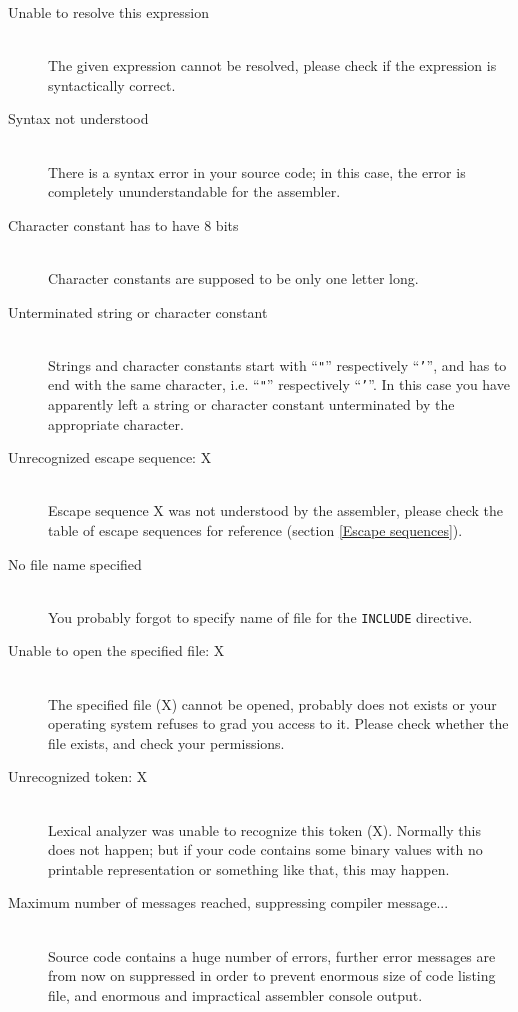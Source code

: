 \begin{description}
        \item[Unable to resolve this expression]~\\
            The given expression cannot be resolved, please check if the expression is syntactically correct.
        \item[Syntax not understood]~\\
            There is a syntax error in your source code; in this case, the error is completely ununderstandable for the assembler.
        \item[Character constant has to have 8 bits]~\\
            Character constants are supposed to be only one letter long.
        \item[Unterminated string or character constant]~\\
            Strings and character constants start with ``\texttt{"}'' respectively ``\texttt{'}'', and has to end with the same character, i.e. ``\texttt{"}'' respectively ``\texttt{'}''. In this case you have apparently left a string or character constant unterminated by the appropriate character.
        \item[Unrecognized escape sequence: X]~\\
            Escape sequence X was not understood by the assembler, please check the table of escape sequences for reference (section \ref{Escape sequences}).
        \item[No file name specified]~\\
            You probably forgot to specify name of file for the \texttt{INCLUDE} directive.
        \item[Unable to open the specified file: X]~\\
            The specified file (X) cannot be opened, probably does not exists or your operating system refuses to grad you access to it. Please check whether the file exists, and check your permissions.
        \item[Unrecognized token: X]~\\
            Lexical analyzer was unable to recognize this token (X). Normally this does not happen; but if your code contains some binary values with no printable representation or something like that, this may happen.
        \item[Maximum number of messages reached, suppressing compiler message...]~\\
            Source code contains a huge number of errors, further error messages are from now on suppressed in order to prevent enormous size of code listing file, and enormous and impractical assembler console output.

\end{description}
